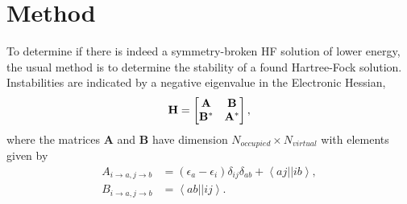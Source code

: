 \documentclass[preprint, journal=prl]{revtex4-1}
\begin{document}
    
    
\section{Method}

  
  To determine if there is indeed a symmetry-broken HF solution of lower energy, the usual method  is to determine the stability of a found Hartree-Fock solution. Instabilities are indicated by a negative eigenvalue in the Electronic Hessian, 
  \begin{equation}
    \bf{H}=
    \begin{bmatrix}
      \bf{A} &\bf{B} \\
      \bf{B}^* & \bf{A}^* \\
    \end{bmatrix},
  \end{equation} 
  where the matrices $\mathbf{A}$ and $\mathbf{B}$ have dimension $N_{occupied} \times N_{virtual}$ with elements given by
  \begin{align}
     A_{i \rightarrow a, j \rightarrow b} &= (\epsilon_a-\epsilon_i)\delta_{ij}\delta_{ab} 
     + \left< aj||ib \right>, \\
     B_{i \rightarrow a, j \rightarrow b} &= \left< ab||ij \right>. 
  \end{align}    
  
\end{document}
